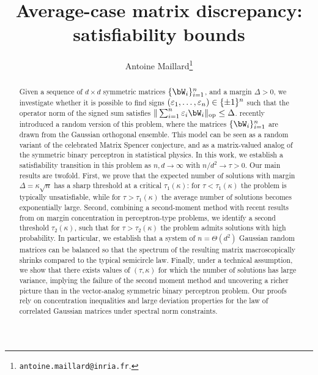 \documentclass[a4paper,11pt]{article}
\begin{document}
\title{Average-case matrix discrepancy: satisfiability bounds}
\date{}
\author{Antoine Maillard\thanks{\texttt{antoine.maillard@inria.fr}.}}

\maketitle

\begin{abstract}
    Given a sequence of $d \times d$ symmetric matrices $\{\bW_i\}_{i=1}^n$, and a margin $\Delta > 0$, we investigate whether it is possible to find signs $(\varepsilon_1, \dots, \varepsilon_n) \in \{\pm 1\}^n$ such that the operator norm of the signed sum satisfies $\|\sum_{i=1}^n \eps_i \bW_i\|_\op \leq \Delta$.
    \cite{kunisky2023online} recently introduced a random version of this problem, where the matrices $\{\bW_i\}_{i=1}^n$ are drawn from the Gaussian orthogonal ensemble. 
    This model can be seen as a random variant of the celebrated Matrix Spencer conjecture, and as a matrix-valued analog of the symmetric binary perceptron in statistical physics.
%
    In this work, we establish a satisfiability transition in this problem as $n, d \to \infty$ with $n / d^2 \to \tau > 0$.
    Our main results are twofold.
    First, we prove that the expected number of solutions with margin $\Delta = \kappa \sqrt{n}$ has a sharp threshold at a critical $\tau_1(\kappa)$: 
    for $\tau < \tau_1(\kappa)$ the problem is typically unsatisfiable, while for $\tau > \tau_1(\kappa)$ the average number of solutions becomes exponentially large.
    Second, combining a second-moment method with recent results from \cite{altschuler2023zero} on margin concentration in perceptron-type problems, we identify a second threshold $\tau_2(\kappa)$, 
    such that for $\tau > \tau_2(\kappa)$ the problem admits solutions with high probability.
%
    In particular, we establish that a system of $n = \Theta(d^2)$ Gaussian random matrices can be balanced so that the spectrum of the resulting matrix macroscopically shrinks compared to the typical semicircle law.
    Finally, under a technical assumption, we show that there exists values of $(\tau,\kappa)$ for which the number of solutions has large variance, 
    implying the failure of the second moment method and uncovering a richer picture than in the vector-analog symmetric binary perceptron problem.
    Our proofs rely on concentration inequalities and large deviation properties for the law of correlated Gaussian matrices under spectral norm constraints.
\end{abstract}
\end{document}
